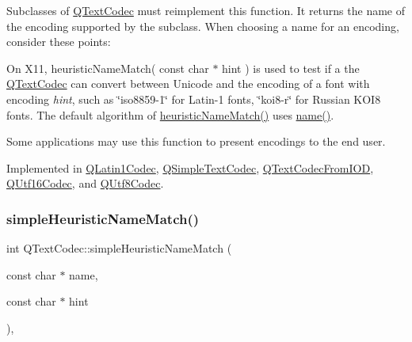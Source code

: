 Subclasses of \mbox{\hyperlink{class_q_text_codec}{Q\+Text\+Codec}} must reimplement this function. It returns the name of the encoding supported by the subclass. When choosing a name for an encoding, consider these points\+: 
\begin{DoxyItemize}
\item On X11, heuristic\+Name\+Match( const char $\ast$ hint ) is used to test if a the \mbox{\hyperlink{class_q_text_codec}{Q\+Text\+Codec}} can convert between Unicode and the encoding of a font with encoding {\itshape hint}, such as \char`\"{}iso8859-\/1\char`\"{} for Latin-\/1 fonts, \char`\"{}koi8-\/r\char`\"{} for Russian K\+O\+I8 fonts. The default algorithm of \mbox{\hyperlink{class_q_text_codec_a1bcf2f11fac6113fd6ae74dda55b2ca4}{heuristic\+Name\+Match()}} uses \mbox{\hyperlink{class_q_text_codec_a5b735ce19dc6b0fb0e8858bd3f54f0e2}{name()}}. 
\item Some applications may use this function to present encodings to the end user. 
\end{DoxyItemize}

Implemented in \mbox{\hyperlink{class_q_latin1_codec_ae85de05cd63fcb55c7fddceeb9d524d8}{Q\+Latin1\+Codec}}, \mbox{\hyperlink{class_q_simple_text_codec_a4e7462d95d59b6262f201d79a392bde9}{Q\+Simple\+Text\+Codec}}, \mbox{\hyperlink{class_q_text_codec_from_i_o_d_ac80023588673bad8a8b0d6983832c884}{Q\+Text\+Codec\+From\+I\+OD}}, \mbox{\hyperlink{class_q_utf16_codec_ab5bf550f93083d25bf13f5f7497088db}{Q\+Utf16\+Codec}}, and \mbox{\hyperlink{class_q_utf8_codec_a9857944175edc61a1e568a2503a5c434}{Q\+Utf8\+Codec}}.

\mbox{\label{class_q_text_codec_a16459bb8c9e7c502547f45e5387fbb03}} 
\subsubsection{\texorpdfstring{simpleHeuristicNameMatch()}{simpleHeuristicNameMatch()}}
{\footnotesize\ttfamily int Q\+Text\+Codec\+::simple\+Heuristic\+Name\+Match (\begin{DoxyParamCaption}\item[{const char $\ast$}]{name,  }\item[{const char $\ast$}]{hint }\end{DoxyParamCaption})\hspace{0.3cm}{\ttfamily [static]}, {\ttfamily [protected]}}

